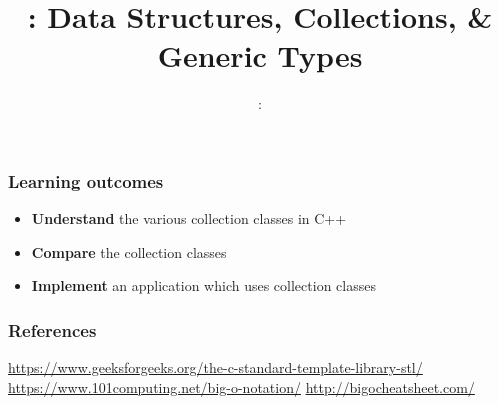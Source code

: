 \usepackage{../../beamerthemeFalmouthGamesAcademy}
\usepackage{multimedia}
\graphicspath{ {../../} }


\usepackage[normalem]{ulem}
\usepackage{wasysym}
\usepackage{listings}
\usepackage{pdfpages}
\usepackage[T1]{fontenc} 

\usetikzlibrary{arrows,automata}




\title{\sessionnumber: Data Structures, Collections, \& Generic Types}
\subtitle{\modulecode: \moduletitle}

\frame{\titlepage}

\begin{frame}
	\frametitle{Learning outcomes}
	\begin{itemize}
		\item \textbf{Understand} the various collection classes in C++
		\item \textbf{Compare} the collection classes
		\item \textbf{Implement} an application which uses collection classes
	\end{itemize}
\end{frame}











%


\begin{frame}
\frametitle{References}
\url{https://www.geeksforgeeks.org/the-c-standard-template-library-stl/}
\url{https://www.101computing.net/big-o-notation/}
\url{http://bigocheatsheet.com/}
\end{frame}



